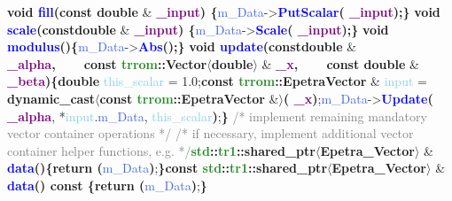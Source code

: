     \tab\textbf{\textcolor{BrickRed}{void} \textcolor{blue}{fill}(const \textcolor{BrickRed}{double}} \& \textbf{\textcolor{Purple}{ \_input}) \{}\textcolor{RoyalBlue}{m\_Data}-\textgreater\textbf{\textcolor{blue}{PutScalar}(\textcolor{Purple}{ \_input});\}}\newline
    \tab\textbf{\textcolor{BrickRed}{void} \textcolor{blue}{scale}(const\textcolor{BrickRed}{double}} \& \textbf{\textcolor{Purple}{ \_input}) \{}\textcolor{RoyalBlue}{m\_Data}-\textgreater\textbf{\textcolor{blue}{Scale}(\textcolor{Purple}{ \_input});\}}\newline
    \tab\textbf{\textcolor{BrickRed}{void} \textcolor{blue}{modulus}()\{}\textcolor{RoyalBlue}{m\_Data}-\textgreater\textbf{\textcolor{blue}{Abs}();\}}\newline
    \tab\textbf{\textcolor{BrickRed}{void} \textcolor{blue}{update}(const\textcolor{BrickRed}{double}} \& \textbf{\textcolor{Purple}{ \_alpha},\newline\tab\tab\tab\ \ \ \ const \textcolor{ForestGreen}{trrom}::\textcolor{Melon}{Vector}$\mathbf{\langle}$\textcolor{BrickRed}{double}$\mathbf{\rangle}$} \& \textbf{\textcolor{Purple}{ \_x},\newline\tab\tab\tab\ \ \ \ const \textcolor{BrickRed}{double}} \& \textbf{\textcolor{Purple}{ \_beta})\{}\newline\tab\tab\textbf{\textcolor{BrickRed}{double}} \textcolor{SkyBlue}{this\_scalar} = 1.0;\newline\tab\tab\textbf{const \textcolor{ForestGreen}{trrom}::\textcolor{Melon}{EpetraVector}} \& \textcolor{SkyBlue}{input} = \newline\tab\tab\tab\textbf{dynamic\_cast$\langle$const \textcolor{ForestGreen}{trrom}::\textcolor{Melon}{EpetraVector}} \&$\rangle$\textbf{(\textcolor{Purple}{ \_x})};\newline\tab\tab\textcolor{RoyalBlue}{m\_Data}-\textgreater\textbf{\textcolor{blue}{Update}(\textcolor{Purple}{ \_alpha}}, *\textcolor{SkyBlue}{input}.\textcolor{RoyalBlue}{m\_Data}, \textcolor{SkyBlue}{this\_scalar}\textbf{)};\newline\tab\textbf{\}}\newline\newline
    \tab\textcolor{gray}{/* implement remaining mandatory vector container operations */}\newline\newline
    \tab\textcolor{gray}{/* if necessary, implement additional vector container helper functions, e.g. */}\newline\tab\textbf{\textcolor{ForestGreen}{std}::\textcolor{ForestGreen}{tr1}::\textcolor{Melon}{shared\_ptr}$\langle$\textcolor{Melon}{Epetra\_Vector}$\rangle$} \& \textbf{\textcolor{blue}{data}()\{return (}\textcolor{RoyalBlue}{m\_Data}\textbf{)};\textbf{\}}\newline\tab\textbf{const \textcolor{ForestGreen}{std}::\textcolor{ForestGreen}{tr1}::\textcolor{Melon}{shared\_ptr}$\langle$\textcolor{Melon}{Epetra\_Vector}$\rangle$} \& \textbf{\textcolor{blue}{data}() const \{return (}\textcolor{RoyalBlue}{m\_Data}\textbf{)};\textbf{\}}\newline\newline
